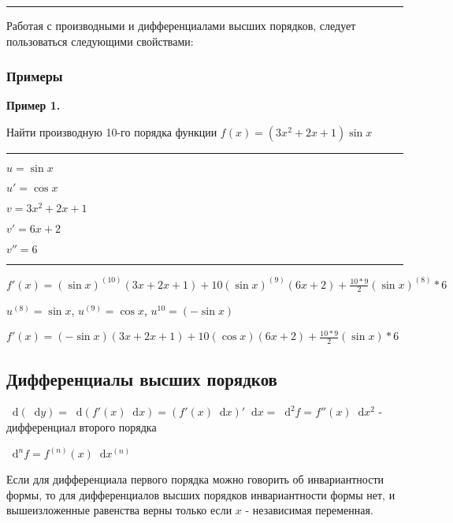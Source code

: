 \documentclass{article}
\newcommand*\diff{\mathop{}\!\mathrm{d}}
\begin{document}
\begin{flushleft}
\rule{\textwidth}{0.2pt}

\hfill

Работая с производными и дифференциалами высших порядков, следует пользоваться следующими свойствами:

\begin{multienumerate}
\end{multienumerate}

\subsubsection{Примеры}

\textbf{Пример 1.}

Найти производную 10-го порядка функции $f(x) = (3x^2 + 2x + 1) \sin x$

\hfill

\rule{\textwidth}{0.2pt}

\parbox{0.43\textwidth}{
$u = \sin x$

$u' = \cos x$   
}
\parbox{0.45\textwidth}{
$v = 3x^2 + 2x + 1$

$v' = 6x + 2$

$v'' = 6$
}

\rule{\textwidth}{0.2pt}

\hfill

$f'(x) = (\sin x)^{(10)} (3x + 2x + 1) + 10 (\sin x)^{(9)} (6x + 2) + \frac{10 * 9}{2} (\sin x)^{(8)} * 6$

\hfill

$u^{(8)} = \sin x$, $u^{(9)} = \cos x$, $u^{10} = (-\sin x)$

\hfill

$f'(x) = (-\sin x) (3x + 2x + 1) + 10 (\cos x) (6x + 2) + \frac{10 * 9}{2} (\sin x) * 6$

\pagebreak
\subsection{Дифференциалы высших порядков}

$\diff (\diff y) = \diff (f'(x) \diff x) = (f' (x) \diff x)' \diff x = \diff^2 f = f''(x) \diff x^2$ - дифференциал второго порядка

$\diff^{n} f = f^{(n)} (x) \diff x^{(n)}$

\hfill

Если для дифференциала первого порядка можно говорить об инвариантности формы, то для дифференциалов высших порядков инвариантности формы нет, и вышеизложенные равенства верны только если $x$ - независимая переменная.

\end{flushleft}
\end{document}
